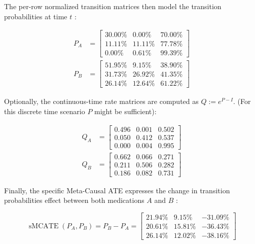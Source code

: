 \documentclass[10pt]{article}
\begin{document}
The per-row normalized transition matrices then model the transition probabilities at time $t$ :


\begin{align*}
P_{A} & =\left[\begin{array}{ccc}
30.00 \% & 0.00 \% & 70.00 \% \\
11.11 \% & 11.11 \% & 77.78 \% \\
0.00 \% & 0.61 \% & 99.39 \%
\end{array}\right]  \tag{32}\\
P_{B} & =\left[\begin{array}{ccc}
51.95 \% & 9.15 \% & 38.90 \% \\
31.73 \% & 26.92 \% & 41.35 \% \\
26.14 \% & 12.64 \% & 61.22 \%
\end{array}\right] \tag{33}
\end{align*}


Optionally, the continuous-time rate matrices are computed as $Q:=e^{P-I}$. (For this discrete time scenario $P$ might be sufficient):


\begin{align*}
Q_{A} & =\left[\begin{array}{lll}
0.496 & 0.001 & 0.502 \\
0.050 & 0.412 & 0.537 \\
0.000 & 0.004 & 0.995
\end{array}\right]  \tag{34}\\
Q_{B} & =\left[\begin{array}{lll}
0.662 & 0.066 & 0.271 \\
0.211 & 0.506 & 0.282 \\
0.186 & 0.082 & 0.731
\end{array}\right] \tag{35}
\end{align*}


Finally, the specific Meta-Causal ATE expresses the change in transition probabilities effect between both medications $A$ and $B$ :

\[
\operatorname{sMCATE}\left(P_{A}, P_{B}\right)=P_{B}-P_{A}=\left[\begin{array}{ccc}
21.94 \% & 9.15 \% & -31.09 \%  \tag{36}\\
20.61 \% & 15.81 \% & -36.43 \% \\
26.14 \% & 12.02 \% & -38.16 \%
\end{array}\right]
\]
\end{document}
